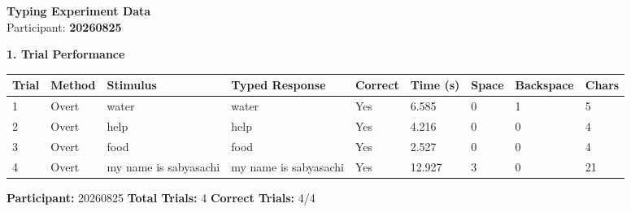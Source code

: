 \documentclass[10pt,a4paper]{article}
\begin{document}

\begin{center}
    {\Large\bfseries Typing Experiment Data}\\
    \vspace{2pt}
    Participant: \textbf{20260825}
\end{center}

\vspace{0.25cm}


\noindent
{\large\bfseries 1. Trial Performance}

\vspace{0.08cm}

\begin{center}
\begin{tabularx}{\textwidth}{
    C{0.45in}
    C{0.65in}
    L{2.35in}
    L{2.55in}
    C{0.65in}
    C{0.65in}
    C{0.55in}
    C{0.75in}
    C{0.55in}
}
\toprule

\textbf{Trial} &
\textbf{Method} &
\textbf{Stimulus} &
\textbf{Typed Response} &
\textbf{Correct} &
\textbf{Time (s)} &
\textbf{Space} &
\textbf{Backspace} &
\textbf{Chars}
\\

\midrule

1 &
Overt &
water &
water &
Yes &
6.585 &
0 &
1 &
5
\\

2 &
Overt &
help &
help &
Yes &
4.216 &
0 &
0 &
4
\\

3 &
Overt &
food &
food &
Yes &
2.527 &
0 &
0 &
4
\\

4 &
Overt &
my name is sabyasachi &
my name is sabyasachi &
Yes &
12.927 &
3 &
0 &
21
\\

\bottomrule
\end{tabularx}
\end{center}

\vfill


\noindent
\textbf{Participant:} 20260825
\hfill
\textbf{Total Trials:} 4
\hfill
\textbf{Correct Trials:} 4/4
\end{document}
